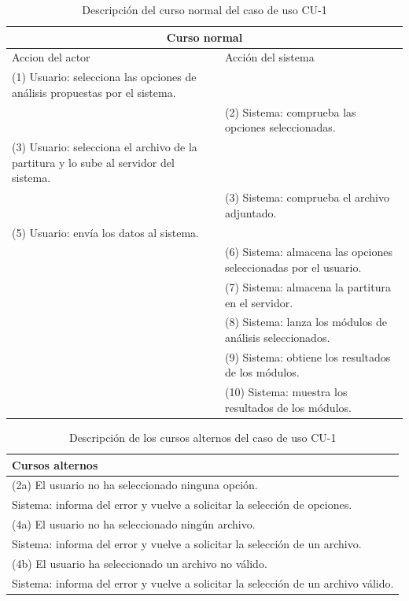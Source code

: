 \begin{table}[H]
	\begin{tabular}{@{}|p{7.1cm}|p{7.1cm}|@{}}
		\hline
		\multicolumn{2}{|c|}{\textbf{Curso normal}}\\ \hline
		{Accion del actor} & {Acción del sistema} \\ \hline
		(1) Usuario: selecciona las opciones de análisis propuestas por el sistema. & \\ \hline
		 & (2) Sistema: comprueba las opciones seleccionadas. \\ \hline 
		(3) Usuario: selecciona el archivo de la partitura y lo sube al servidor del sistema. &  \\ \hline
		 & (3) Sistema: comprueba el archivo adjuntado.  \\ \hline 
		(5) Usuario: envía los datos al sistema. & \\ \hline
		 & (6) Sistema: almacena las opciones seleccionadas por el usuario.  \\ \hline
		 & (7) Sistema: almacena la partitura en el servidor.  \\ \hline
		 & (8) Sistema: lanza los módulos de análisis seleccionados.  \\ \hline
		 & (9) Sistema: obtiene los resultados de los módulos. \\ \hline
		 & (10) Sistema: muestra los resultados de los módulos. \\ \hline
	\end{tabular}
	\caption{Descripción del curso normal del caso de uso CU-1}
	\label{CNCU-1}
\end{table}

\begin{table}[H]
	\begin{tabular}{@{}|p{14.7cm}|@{}}
		\hline
		\textbf{Cursos alternos}\\ \hline
		(2a) El usuario no ha seleccionado ninguna opción. \\ 
		\hspace{1.5cm}Sistema: informa del error y vuelve a solicitar la selección de opciones. \\
		(4a) El usuario no ha seleccionado ningún archivo. \\
		\hspace{1.5cm}Sistema: informa del error y vuelve a solicitar la selección de un archivo. \\
		(4b) El usuario ha seleccionado un archivo no válido. \\
		\hspace{1.5cm}Sistema: informa del error y vuelve a solicitar la selección de un archivo válido. \\ \hline
	\end{tabular}
	\caption{Descripción de los cursos alternos del caso de uso CU-1}
	\label{CACU-1}
\end{table}

